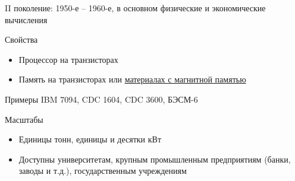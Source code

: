 \documentclass[xetex,aspectratio=43]{beamer}
\begin{document}
\begin{frame}{II поколение: 1950-е -- 1960-е, в основном физические и экономические вычисления}

	\begin{block}{Свойства}
		\begin{itemize}
			\item
			Процессор на транзисторах
			\item
			Память на транзисторах или
			\href{https://en.wikipedia.org/wiki/Magnetic-core_memory}{материалах с
				магнитной памятью}
		\end{itemize}
	\end{block}

	\begin{block}{Примеры}
		IBM 7094, CDC 1604, CDC 3600, БЭСМ-6
	\end{block}

	\begin{block}{Масштабы}
		\begin{itemize}
			\item
			Единицы тонн, единицы и десятки кВт
			\item
			Доступны университетам, крупным промышленным предприятиям (банки,
			заводы и т.д.), государственным учреждениям
		\end{itemize}
	\end{block}
\end{frame}
\end{document}
